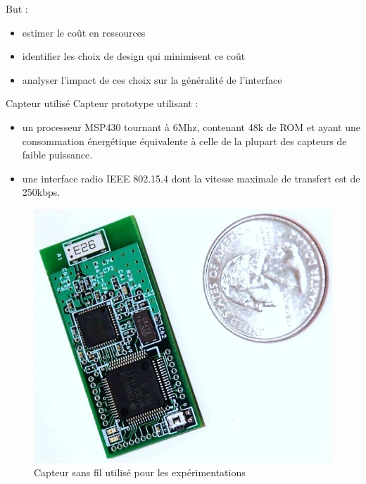 \begin{frame}
But : 
\begin{itemize}
\item estimer le coût en ressources
\item identifier les choix de design qui minimisent ce coût
\item analyser l'impact de ces choix sur la généralité de l'interface
\end{itemize}

\end{frame}

\begin{frame}{Capteur utilisé}
Capteur prototype utilisant :
\begin{itemize}
\item un processeur MSP430 tournant à 6Mhz, contenant 48k de ROM et ayant une consommation énergétique équivalente à celle de la plupart des capteurs de faible puissance.
\item une interface radio IEEE 802.15.4 dont la vitesse maximale de transfert est de 250kbps.
\end{itemize}
\begin{figure}
  \centering
  \includegraphics[scale=0.15]{figures/tws08-000.jpg}
  \caption{Capteur sans fil utilisé pour les expérimentations}
 \end{figure} 
\end{frame}

